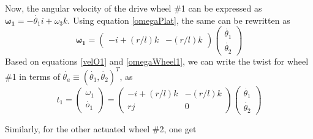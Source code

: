 Now, the angular velocity of the drive wheel \#1 can be expressed as $\bm{\omega_1}=-\dot{\theta_1}i+\omega_3k$. Using equation \ref{omegaPlat}, the same can be rewritten as 
\begin{equation}
\label{omegaWheel1}
\bm{\omega_1}=\begin{pmatrix}
-i+(r/l)k & -(r/l)k
\end{pmatrix}
\begin{pmatrix}
\dot{\theta_1}\\\dot{\theta_2}
\end{pmatrix}
\end{equation}
Based on  equations \ref{velO1} and \ref{omegaWheel1}, we can write the twist for wheel \#1 in terms of $\dot{\theta_a}\equiv (\dot{\theta_1},\dot{\theta_2})^T$, as 
\begin{equation}
\label{twist1}
t_1=\begin{pmatrix}
\omega_1\\\dot{o_1}
\end{pmatrix}=
\begin{pmatrix}
-i+(r/l)k & -(r/l)k\\ rj & 0
\end{pmatrix}
\begin{pmatrix}
\dot{\theta_1}\\\dot{\theta_2}
\end{pmatrix}
\end{equation}

Similarly, for the other actuated wheel \#2, one get

